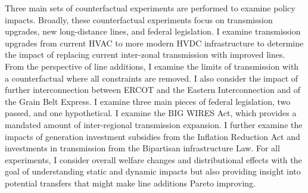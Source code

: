 \documentclass[12pt]{article}
\begin{document}
Three main sets of counterfactual experiments are performed to examine policy impacts. Broadly, these counterfactual experiments focus on transmission upgrades, new long-distance lines, and federal legislation. I examine transmission upgrades from current HVAC to more modern HVDC infrastructure to determine the impact of replacing current inter-zonal transmission with improved lines. From the perspective of line additions, I examine the limits of transmission with a counterfactual where all constraints are removed. I also consider the impact of further interconnection between ERCOT and the Eastern Interconnection and of the Grain Belt Express. I examine three main pieces of federal legislation, two passed, and one hypothetical. I examine the BIG WIRES Act, which provides a mandated amount of inter-regional transmission expansion. I further examine the impacts of generation investment subsidies from the Inflation Reduction Act and investments in transmission from the Bipartisan infrastructure Law. For all experiments, I consider overall welfare changes and distributional effects with the goal of understanding static and dynamic impacts but also providing insight into potential transfers that might make line additions Pareto improving.

\end{document}
